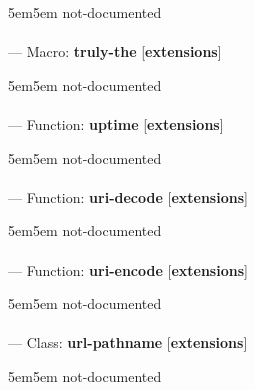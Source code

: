 \begin{adjustwidth}{5em}{5em}
not-documented
\end{adjustwidth}

\paragraph{}
\label{EXTENSIONS:TRULY-THE}
--- Macro: \textbf{truly-the} [\textbf{extensions}] \textit{}

\begin{adjustwidth}{5em}{5em}
not-documented
\end{adjustwidth}

\paragraph{}
\label{EXTENSIONS:UPTIME}
--- Function: \textbf{uptime} [\textbf{extensions}] \textit{}

\begin{adjustwidth}{5em}{5em}
not-documented
\end{adjustwidth}

\paragraph{}
\label{EXTENSIONS:URI-DECODE}
--- Function: \textbf{uri-decode} [\textbf{extensions}] \textit{}

\begin{adjustwidth}{5em}{5em}
not-documented
\end{adjustwidth}

\paragraph{}
\label{EXTENSIONS:URI-ENCODE}
--- Function: \textbf{uri-encode} [\textbf{extensions}] \textit{}

\begin{adjustwidth}{5em}{5em}
not-documented
\end{adjustwidth}

\paragraph{}
\label{EXTENSIONS:URL-PATHNAME}
--- Class: \textbf{url-pathname} [\textbf{extensions}] \textit{}

\begin{adjustwidth}{5em}{5em}
not-documented
\end{adjustwidth}

